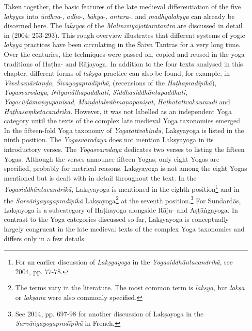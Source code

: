 {Taken together, the basic features of the late medieval differentiation of the five \textit{lakṣya}s into \textit{ūrdhva}-, \textit{adho}-, \textit{bāhya}-, \textit{antara}-, and \textit{madhyalakṣya} can already be discerned here. The \textit{lakṣya}s of the \textit{Mālinīviyajottaratantra} are discussed in detail in \citeauthor{vasudeva2004} (2004: 253-293). This rough overview illustrates that different systems of yogic \textit{lakṣya} practices have been circulating in the Śaiva Tantras for a very long time. Over the centuries, the techniques were passed on, copied and reused in the yoga traditions of Haṭha- and Rājayoga. In addition to the four texts analysed in this chapter, different forms of \textit{lakṣya} practice can also be found, for example, in \textit{Vivekamārtaṇḍa}, \textit{Śivayogapradīpikā}, (recensions of the \textit{Haṭhapradīpikā}), \textit{Yogasvarodaya}, \textit{Nityanāthapaddhati}, \textit{Siddhasiddhāntapaddhati}, \textit{Yogacūḍāmaṇyupaniṣad}, \textit{Maṇḍalabrāhmaṇopaniṣat}, \textit{Haṭhatattvakaumudi} and \textit{Haṭhasaṃketacandrikā}.} However, it was not labelled as an independent Yoga category until the texts of the complex late medieval Yoga taxonomies emerged. In the fifteen-fold Yoga taxonomy of \textit{Yogatattvabindu}, Lakṣyayoga is listed in the ninth position. The \textit{Yogasvarodaya} does not mention Lakṣyayoga in its introductory verses. The \textit{Yogasvarodaya} dedicates two verses to listing the fifteen Yogas. Although the verses announce fifteen Yogas, only eight Yogas are specified, probably for metrical reasons. Lakṣyayoga is not among the eight Yogas mentioned but is dealt with in detail throughout the text. In the \textit{Yogasiddhāntacandrikā}, Lakṣyayoga is mentioned in the eighth position\footnote{For an earlier discussion of \textit{Lakṣyayoga} in the \textit{Yogasiddhāntacandrikā}, see \citeauthor{penna2004} 2004, pp. 77-78.} and in the \textit{Sarvāṅgayogapradīpikā} Lakṣayoga\footnote{The terms vary in the literature. The most common term is \textit{lakṣya}, but \textit{lakṣa} or \textit{lakṣana} were also commonly specified.} at the seventh position.\footnote{See \citeauthor{burger2014sarvangayogapradipika} 2014, pp. 697-98 for another discussion of Lakṣayoga in the \textit{Sarvāṅgayogapradīpikā} in French.} For Sundardās, Lakṣayoga is a subcategory of Haṭhayoga alongside Rāja- and Aṣṭāṅgayoga. In contrast to the Yoga categories discussed so far, Lakṣyayoga is conceptually largely congruent in the late medieval texts of the complex Yoga taxonomies and differs only in a few details.

